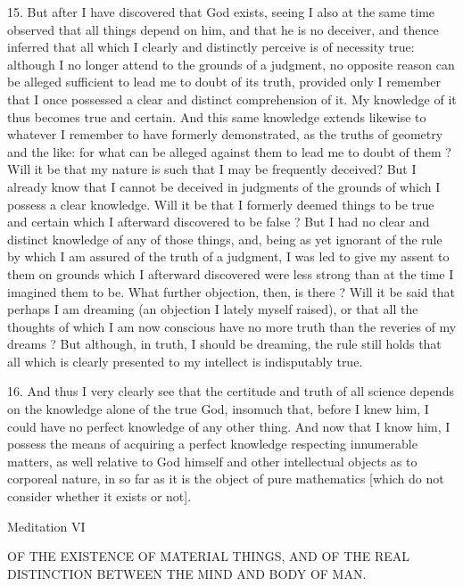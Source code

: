 15. But after I have discovered that God exists, seeing I also at the same time observed that all things depend on him, and that he is no deceiver, and thence inferred that all which I clearly and distinctly perceive is of necessity true: although I no longer attend to the grounds of a judgment, no opposite reason can be alleged sufficient to lead me to doubt of its truth, provided only I remember that I once possessed a clear and distinct comprehension of it. My knowledge of it thus becomes true and certain. And this same knowledge extends likewise to whatever I remember to have formerly demonstrated, as the truths of geometry and the like: for what can be alleged against them to lead me to doubt of them ? Will it be that my nature is such that I may be frequently deceived? But I already know that I cannot be deceived in judgments of the grounds of which I possess a clear knowledge. Will it be that I formerly deemed things to be true and certain which I afterward discovered to be false ? But I had no clear and distinct knowledge of any of those things, and, being as yet ignorant of the rule by which I am assured of the truth of a judgment, I was led to give my assent to them on grounds which I afterward discovered were less strong than at the time I imagined them to be. What further objection, then, is there ? Will it be said that perhaps I am dreaming (an objection I lately myself raised), or that all the thoughts of which I am now conscious have no more truth than the reveries of my dreams ? But although, in truth, I should be dreaming, the rule still holds that all which is clearly presented to my intellect is indisputably true.

16. And thus I very clearly see that the certitude and truth of all science depends on the knowledge alone of the true God, insomuch that, before I knew him, I could have no perfect knowledge of any other thing. And now that I know him, I possess the means of acquiring a perfect knowledge respecting innumerable matters, as well relative to God himself and other intellectual objects as to corporeal nature, in so far as it is the object of pure mathematics [which do not consider whether it exists or not].

Meditation VI


OF THE EXISTENCE OF MATERIAL THINGS, AND OF THE REAL DISTINCTION BETWEEN THE MIND AND BODY OF MAN.

